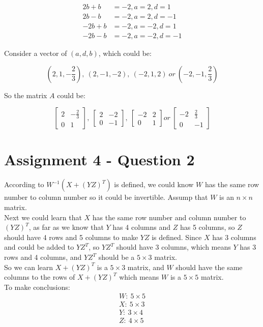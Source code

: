 \documentclass{article}
\begin{document}
$$
\begin{aligned}
2b + b &= -2, a = 2, d = 1\\
2b - b &= -2, a = 2, d = -1\\
-2b + b &= -2, a = -2, d = 1\\
-2b - b &= -2, a = -2, d = -1
\end{aligned}
$$

Consider a vector of $(a,d,b)$, which could be:

$$
(2,1,-\frac{2}{3}),\ (2,-1,-2),\ (-2,1,2) \ or \ (-2,-1,\frac{2}{3})
$$

So the matrix $A$ could be:

$$
\begin{bmatrix}
    2 & -\frac{2}{3}\\
    0 & 1
\end{bmatrix}
,\
\begin{bmatrix}
    2 & -2\\
    0 & -1
\end{bmatrix}
,\
\begin{bmatrix}
    -2 & 2\\
    0 & 1
\end{bmatrix}
or\
\begin{bmatrix}
    -2 & \frac{2}{3}\\
    0 & -1
\end{bmatrix}
$$

\section*{Assignment 4 - Question 2}

According to $W^{-1} (X + (YZ)^{T})$ is defined, we could know $W$ has the same row number to column number so it could be invertible. 
Assump that $W$ is an $n \times n$ matrix.\\
Next we could learn that $X$ has the same row number and column number to $(YZ)^{T}$, as far as we know that $Y$ has 4 columns 
and $Z$ has 5 columns, so $Z$ should have 4 rows and 5 columns to make $YZ$ is defined. Since $X$ has 3 columns and could be added to 
$YZ^{T}$, so $YZ^{T}$ should have 3 columns, which means $Y$ has 3 rows and 4 columns, and $YZ^{T}$ should be a $5 \times 3$ matrix.\\
So we can learn $X + (YZ)^{T}$ is a $5 \times 3$ matrix, and $W$ should have the same columns to the rows of $X + (YZ)^{T}$ which means 
$W$ is a $5\times 5$ matrix.\\
To make conclusions:
\begin{align*}
    W:\ 5 \times 5\\
    X:\ 5 \times 3\\
    Y:\ 3 \times 4\\
    Z:\ 4 \times 5 
\end{align*}
\end{document}

